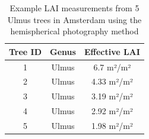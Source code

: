\begin{table}[ht!]
    \centering
    \begin{tabular}{ccc}
        \toprule
        Tree ID & Genus & Effective LAI \\
        \midrule
        1 & Ulmus & 6.7 m²/m² \\
        2 & Ulmus & 4.33 m²/m² \\
        3 & Ulmus & 3.19 m²/m²\\
        4 & Ulmus & 2.92 m²/m²\\
        5 & Ulmus & 1.98 m²/m² \\
        \bottomrule
    \end{tabular}
    \caption{Example LAI measurements from 5 Ulmus trees in Amsterdam using the hemispherical photography method}
    \label{tab:Hemspherical_LAI}
\end{table}

